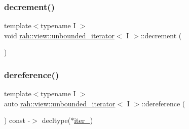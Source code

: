 \subsubsection{\texorpdfstring{decrement()}{decrement()}\hspace{0.1cm}{\footnotesize\ttfamily [2/2]}}
{\footnotesize\ttfamily template$<$typename I $>$ \\
void \mbox{\hyperlink{structrah_1_1view_1_1unbounded__iterator}{rah\+::view\+::unbounded\+\_\+iterator}}$<$ I $>$\+::decrement (\begin{DoxyParamCaption}{ }\end{DoxyParamCaption})\hspace{0.3cm}{\ttfamily [inline]}}

\mbox{\label{structrah_1_1view_1_1unbounded__iterator_a99189d6052f625642f8e00ff6e58a860}} 
\subsubsection{\texorpdfstring{dereference()}{dereference()}\hspace{0.1cm}{\footnotesize\ttfamily [1/2]}}
{\footnotesize\ttfamily template$<$typename I $>$ \\
auto \mbox{\hyperlink{structrah_1_1view_1_1unbounded__iterator}{rah\+::view\+::unbounded\+\_\+iterator}}$<$ I $>$\+::dereference (\begin{DoxyParamCaption}{ }\end{DoxyParamCaption}) const -\/$>$ decltype($\ast$\mbox{\hyperlink{structrah_1_1view_1_1unbounded__iterator_a50affaae71d4122b92014b11763f6672}{iter\+\_\+}}) \hspace{0.3cm}{\ttfamily [inline]}}

\mbox{\label{structrah_1_1view_1_1unbounded__iterator_a99189d6052f625642f8e00ff6e58a860}} 
